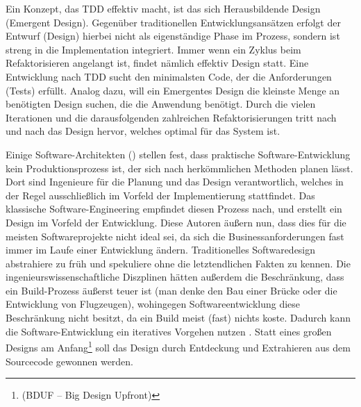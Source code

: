 Ein Konzept, das TDD effektiv macht, ist das sich Herausbildende Design (Emergent Design). Gegenüber traditionellen Entwicklungsansätzen erfolgt der Entwurf (Design) hierbei nicht als eigenständige Phase im Prozess, sondern ist streng in die Implementation integriert. Immer wenn ein Zyklus beim Refaktorisieren angelangt ist, findet nämlich effektiv Design statt. Eine Entwicklung nach TDD sucht den minimalsten Code, der die Anforderungen (Tests) erfüllt. Analog dazu, will ein Emergentes Design die kleinste Menge an benötigten Design suchen, die die Anwendung benötigt. Durch die vielen Iterationen und die darausfolgenden zahlreichen Refaktorisierungen tritt nach und nach das Design hervor, welches optimal für das System ist.


Einige Software-Architekten (\cite{neal_ford_emergent_2010,jack_reeves_three_1992,glenn_vanderburg_real_2010}) stellen fest, dass praktische Software\hyp{}Entwicklung kein Produktionsprozess ist, der sich nach herkömmlichen Methoden planen lässt. Dort sind Ingenieure für die Planung und das Design verantwortlich, welches in der Regel ausschließlich im Vorfeld der Implementierung stattfindet. Das klassische Software-Engineering empfindet diesen Prozess nach, und erstellt ein Design im Vorfeld der Entwicklung. Diese Autoren äußern nun, dass dies für die meisten Softwareprojekte nicht ideal sei, da sich die Businessanforderungen fast immer im Laufe einer Entwicklung ändern. Traditionelles Softwaredesign abstrahiere zu früh und spekuliere ohne die letztendlichen Fakten zu kennen. Die ingenieurswissenschaftliche Diszplinen hätten außerdem die Beschränkung, dass ein Build-Prozess äußerst teuer ist (man denke den Bau einer Brücke oder die Entwicklung von Flugzeugen), wohingegen Softwareentwicklung diese Beschränkung nicht besitzt, da ein Build meist (fast) nichts koste. Dadurch kann die Software-Entwicklung ein iteratives Vorgehen nutzen \cite{neal_ford_emergent_2010,glenn_vanderburg_real_2010,jack_reeves_three_1992}. Statt eines großen Designs am Anfang\footnote{(BDUF -- Big Design Upfront)} soll das Design durch Entdeckung und Extrahieren aus dem Sourcecode gewonnen werden.


